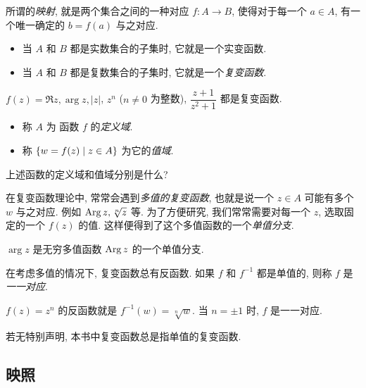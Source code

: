 所谓的\emph{映射}, 就是两个集合之间的一种对应 $f:A\to B$, 使得对于每一个 $a\in A$, 有一个唯一确定的 $b=f(a)$ 与之对应.
\begin{itemize}
  \item 当 $A$ 和 $B$ 都是实数集合的子集时, 它就是一个实变函数.
  \item 当 $A$ 和 $B$ 都是复数集合的子集时, 它就是一个\emph{复变函数}.
\end{itemize}

\begin{example}
  $f(z)=\Re z,\arg z,|z|$, $z^n$ ($n\neq0$ 为整数), $\dfrac{z+1}{z^2+1}$ 都是复变函数.
\end{example}

\begin{definition}
  \begin{itemize}
    \item 称 $A$ 为 函数 $f$ 的\emph{定义域}.
    \item 称 ${\left\{w=f(z)\mid z\in A\right\}}$ 为它的\emph{值域}.\footnotemark
  \end{itemize} 
\end{definition}
\begin{exercise}
  上述函数的定义域和值域分别是什么?
\end{exercise}

在复变函数理论中, 常常会遇到\emph{多值的复变函数}, 也就是说一个 $z\in A$ 可能有多个 $w$ 与之对应.
例如 $\operatorname{Arg} z,\sqrt[n]z$ 等.
为了方便研究, 我们常常需要对每一个 $z$, 选取固定的一个 $f(z)$ 的值.
这样便得到了这个多值函数的一个\emph{单值分支}.
\begin{example}
  $\arg z$ 是无穷多值函数 $\operatorname{Arg} z$ 的一个单值分支.
\end{example}

在考虑多值的情况下, 复变函数总有反函数.
如果 $f$ 和 $f^{-1}$ 都是单值的, 则称 $f$ 是\emph{一一对应}.
\begin{example}
  $f(z)=z^n$ 的反函数就是 $f^{-1}(w)=\sqrt[n]{w}$.
  {当 $n=\pm1$ 时, $f$ 是一一对应.}
\end{example}
若无特别声明, 本书中\alert{复变函数总是指单值的复变函数}.


\subsection{映照}

